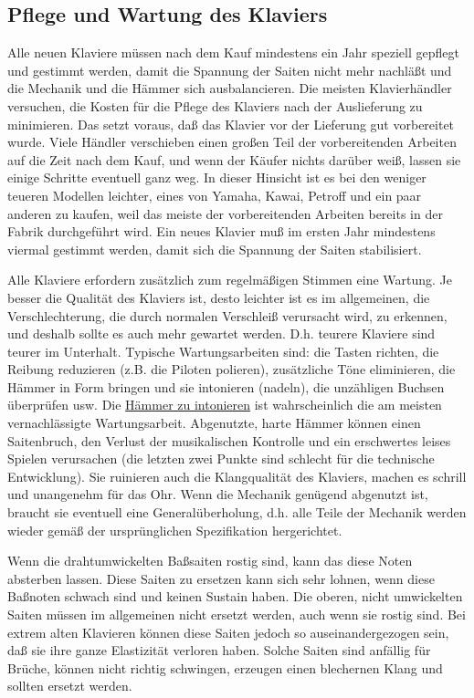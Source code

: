 \subsection{Pflege und Wartung des Klaviers}\hypertarget{c1iii17f}{}

Alle neuen Klaviere müssen nach dem Kauf mindestens ein Jahr speziell gepflegt und gestimmt werden, damit die Spannung der Saiten nicht mehr nachläßt und die Mechanik und die Hämmer sich ausbalancieren.
Die meisten Klavierhändler versuchen, die Kosten für die Pflege des Klaviers nach der Auslieferung zu minimieren.
Das setzt voraus, daß das Klavier vor der Lieferung gut vorbereitet wurde.
Viele Händler verschieben einen großen Teil der vorbereitenden Arbeiten auf die Zeit nach dem Kauf, und wenn der Käufer nichts darüber weiß, lassen sie einige Schritte eventuell ganz weg.
In dieser Hinsicht ist es bei den weniger teueren Modellen leichter, eines von Yamaha, Kawai, Petroff und ein paar anderen zu kaufen, weil das meiste der vorbereitenden Arbeiten bereits in der Fabrik durchgeführt wird.
Ein neues Klavier muß im ersten Jahr mindestens viermal gestimmt werden, damit sich die Spannung der Saiten stabilisiert.

Alle Klaviere erfordern zusätzlich zum regelmäßigen Stimmen eine Wartung.
Je besser die Qualität des Klaviers ist, desto leichter ist es im allgemeinen, die Verschlechterung, die durch normalen Verschleiß verursacht wird, zu erkennen, und deshalb sollte es auch mehr gewartet werden.
D.h. teurere Klaviere sind teurer im Unterhalt.
Typische Wartungsarbeiten sind: die Tasten richten, die Reibung reduzieren (z.B. die Piloten polieren), zusätzliche Töne eliminieren, die Hämmer in Form bringen und sie intonieren (nadeln), die unzähligen Buchsen überprüfen usw.
Die \hyperlink{c2_7_hamm}{Hämmer zu intonieren} ist wahrscheinlich die am meisten vernachlässigte Wartungsarbeit.
Abgenutzte, harte Hämmer können einen Saitenbruch, den Verlust der musikalischen Kontrolle und ein erschwertes leises Spielen verursachen (die letzten zwei Punkte sind schlecht für die technische Entwicklung).
Sie ruinieren auch die Klangqualität des Klaviers, machen es schrill und unangenehm für das Ohr.
Wenn die Mechanik genügend abgenutzt ist, braucht sie eventuell eine Generalüberholung, d.h. alle Teile der Mechanik werden wieder gemäß der ursprünglichen Spezifikation hergerichtet.

Wenn die drahtumwickelten Baßsaiten rostig sind, kann das diese Noten absterben lassen.
Diese Saiten zu ersetzen kann sich sehr lohnen, wenn diese Baßnoten schwach sind und keinen Sustain haben.
Die oberen, nicht umwickelten Saiten müssen im allgemeinen nicht ersetzt werden, auch wenn sie rostig sind.
Bei extrem alten Klavieren können diese Saiten jedoch so auseinandergezogen sein, daß sie ihre ganze Elastizität verloren haben.
Solche Saiten sind anfällig für Brüche, können nicht richtig schwingen, erzeugen einen blechernen Klang und sollten ersetzt werden.

